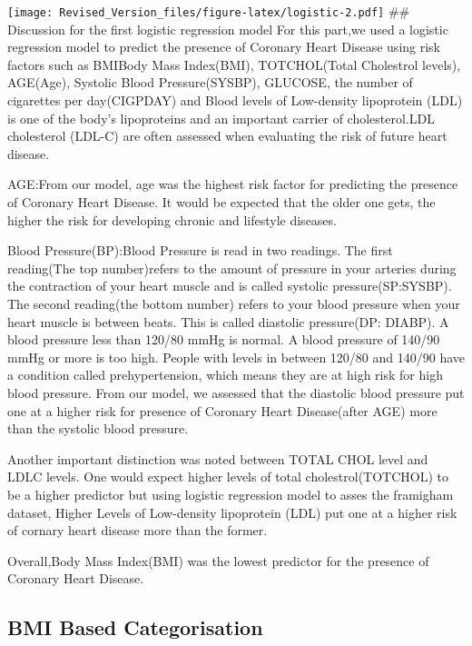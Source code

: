 \documentclass[]{article}
\begin{document}
\texttt{[image: Revised\_Version\_files/figure-latex/logistic-2.pdf]} \#\#
Discussion for the first logistic regression model For this part,we used
a logistic regression model to predict the presence of Coronary Heart
Disease using risk factors such as BMIBody Mass Index(BMI),
TOTCHOL(Total Cholestrol levels), AGE(Age), Systolic Blood
Pressure(SYSBP), GLUCOSE, the number of cigarettes per day(CIGPDAY) and
Blood levels of Low-density lipoprotein (LDL) is one of the body's
lipoproteins and an important carrier of cholesterol.LDL cholesterol
(LDL-C) are often assessed when evaluating the risk of future heart
disease.

AGE:From our model, age was the highest risk factor for predicting the
presence of Coronary Heart Disease. It would be expected that the older
one gets, the higher the risk for developing chronic and lifestyle
diseases.

Blood Pressure(BP):Blood Pressure is read in two readings. The first
reading(The top number)refers to the amount of pressure in your arteries
during the contraction of your heart muscle and is called systolic
pressure(SP:SYSBP). The second reading(the bottom number) refers to your
blood pressure when your heart muscle is between beats. This is called
diastolic pressure(DP: DIABP). A blood pressure less than 120/80 mmHg is
normal. A blood pressure of 140/90 mmHg or more is too high. People with
levels in between 120/80 and 140/90 have a condition called
prehypertension, which means they are at high risk for high blood
pressure. From our model, we assessed that the diastolic blood pressure
put one at a higher risk for presence of Coronary Heart Disease(after
AGE) more than the systolic blood pressure.

Another important distinction was noted between TOTAL CHOL level and
LDLC levels. One would expect higher levels of total cholestrol(TOTCHOL)
to be a higher predictor but using logistic regression model to asses
the framigham dataset, Higher Levels of Low-density lipoprotein (LDL)
put one at a higher risk of cornary heart disease more than the former.

Overall,Body Mass Index(BMI) was the lowest predictor for the presence
of Coronary Heart Disease.

\subsection{BMI Based Categorisation}\label{bmi-based-categorisation}
\end{document}
